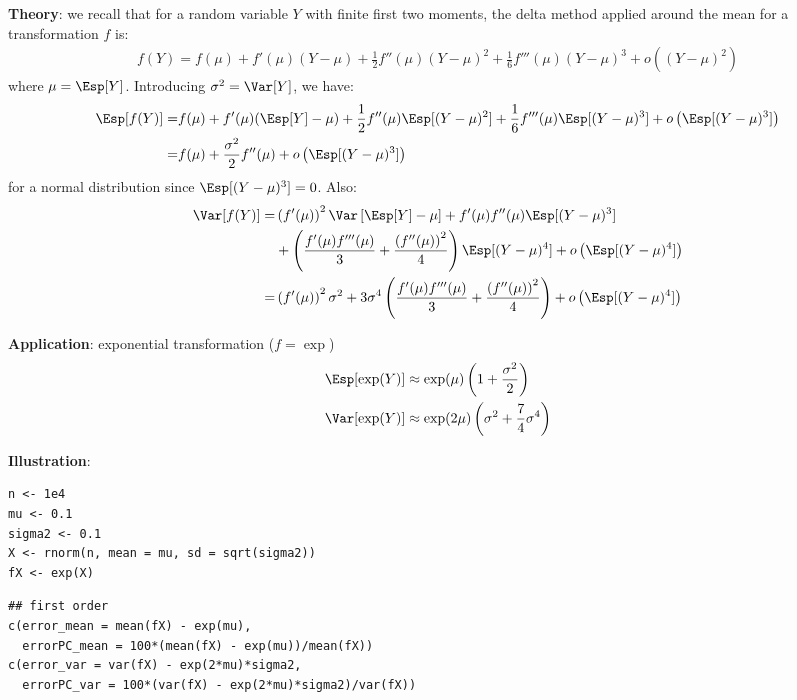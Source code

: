\documentclass[12pt]{article}
\begin{document}
\textbf{Theory}: we recall that for a random variable \(Y\) with finite first two
moments, the delta method applied around the mean for a transformation
\(f\) is:
\begin{align*}
f(Y) = f(\mu) + f'(\mu) (Y-\mu) + \frac{1}{2} f''(\mu) (Y-\mu)^2  + \frac{1}{6} f'''(\mu) (Y-\mu)^3 + o\left((Y-\mu)^2\right)
\end{align*}
where \(\mu=\Esp[Y]\). Introducing \(\sigma^2 = \Var[Y]\), we have:
\begin{align*}
\Esp[f(Y)] =& f(\mu) + f'(\mu) (\Esp[Y]-\mu) + \frac{1}{2} f''(\mu) \Esp[(Y-\mu)^2] + \frac{1}{6} f'''(\mu) \Esp[(Y-\mu)^3] + o\left(\Esp[(Y-\mu)^3]\right) \\
=& f(\mu) + \frac{\sigma^2}{2} f''(\mu)  + o\left(\Esp[(Y-\mu)^3]\right)
\end{align*}
for a normal distribution since \(\Esp[(Y-\mu)^3]=0\). Also:
\begin{align*}
\Var[f(Y)] =& \left(f'(\mu)\right)^2 \Var\left[\Esp[Y]-\mu\right] + f'(\mu)f''(\mu) \Esp[(Y-\mu)^3] \\
& +\left(\frac{f'(\mu) f'''(\mu)}{3} + \frac{\left(f''(\mu)\right)^2}{4}\right) \Esp[(Y-\mu)^4] + o\left(\Esp[(Y-\mu)^4]\right) \\
=& \left(f'(\mu)\right)^2 \sigma^2 + 3 \sigma^4 \left(\frac{f'(\mu) f'''(\mu)}{3} + \frac{\left(f''(\mu)\right)^2}{4}\right) + o\left(\Esp[(Y-\mu)^4]\right) \\
\end{align*}

\bigskip

\textbf{Application}:  exponential transformation (\(f = \exp\))
\begin{align*}
\Esp[\exp(Y)] &\approx \exp(\mu)\left(1 + \frac{\sigma^2}{2}\right) \\
\Var[\exp(Y)] &\approx \exp(2\mu)\left(\sigma^2 + \frac{7}{4} \sigma^4\right) \\
\end{align*}

\textbf{Illustration}: 
\lstset{language=r,label= ,caption= ,captionpos=b,numbers=none}
\begin{lstlisting}
n <- 1e4
mu <- 0.1
sigma2 <- 0.1
X <- rnorm(n, mean = mu, sd = sqrt(sigma2))
fX <- exp(X)
\end{lstlisting}

\lstset{language=r,label= ,caption= ,captionpos=b,numbers=none}
\begin{lstlisting}
## first order
c(error_mean = mean(fX) - exp(mu), 
  errorPC_mean = 100*(mean(fX) - exp(mu))/mean(fX))
c(error_var = var(fX) - exp(2*mu)*sigma2, 
  errorPC_var = 100*(var(fX) - exp(2*mu)*sigma2)/var(fX))
\end{lstlisting}
\end{document}
